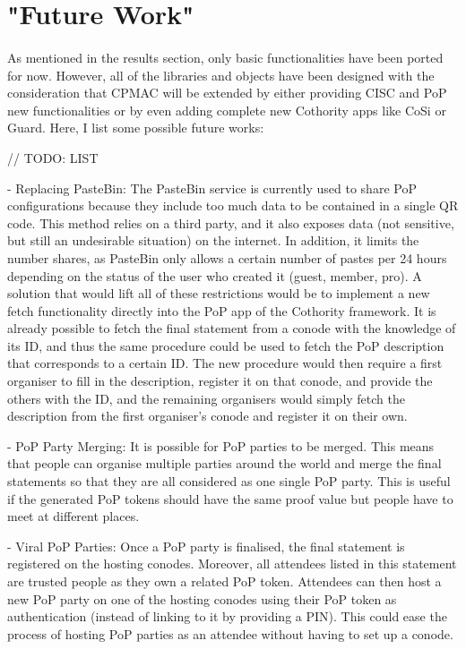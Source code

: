\section{"Future Work"}

\paragraph{}
As mentioned in the results section, only basic functionalities have been ported for now. However, all of the libraries and objects have been designed with the consideration that CPMAC will be extended by either providing CISC and PoP new functionalities or by even adding complete new Cothority apps like CoSi or Guard. Here, I list some possible future works:

// TODO: LIST

- Replacing PasteBin:
  The PasteBin service is currently used to share PoP configurations because they include too much data to be contained in a single QR code. This method relies on a third party, and it also exposes data (not sensitive, but still an undesirable situation) on the internet. In addition, it limits the number shares, as PasteBin only allows a certain number of pastes per 24 hours depending on the status of the user who created it (guest, member, pro). A solution that would lift all of these restrictions would be to implement a new fetch functionality directly into the PoP app of the Cothority framework. It is already possible to fetch the final statement from a conode with the knowledge of its ID, and thus the same procedure could be used to fetch the PoP description that corresponds to a certain ID. The new procedure would then require a first organiser to fill in the description, register it on that conode, and provide the others with the ID, and the remaining organisers would simply fetch the description from the first organiser’s conode and register it on their own.

- PoP Party Merging:
  It is possible for PoP parties to be merged. This means that people can organise multiple parties around the world and merge the final statements so that they are all considered as one single PoP party. This is useful if the generated PoP tokens should have the same proof value but people have to meet at different places.

- Viral PoP Parties:
  Once a PoP party is finalised, the final statement is registered on the hosting conodes. Moreover, all attendees listed in this statement are trusted people as they own a related PoP token. Attendees can then host a new PoP party on one of the hosting conodes using their PoP token as authentication (instead of linking to it by providing a PIN). This could ease the process of hosting PoP parties as an attendee without having to set up a conode.

